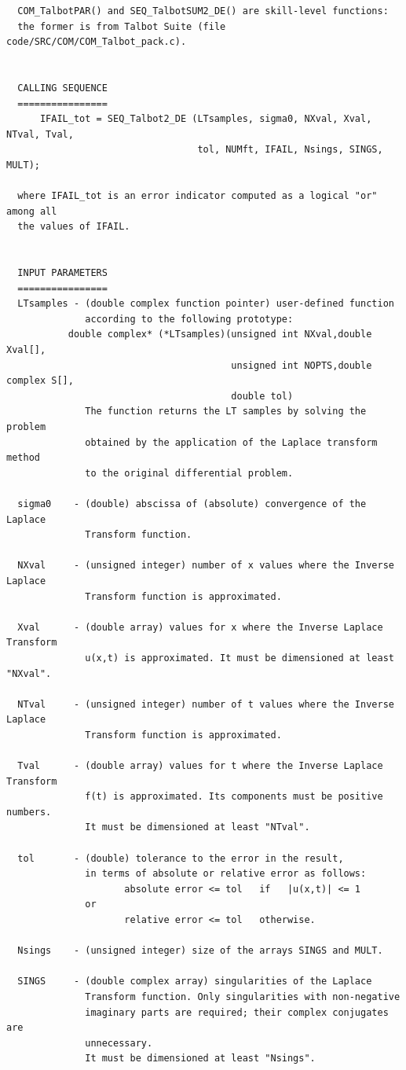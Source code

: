 \documentclass[a4paper,10pt]{report}%
\begin{document}
\begin{lstlisting}
  COM_TalbotPAR() and SEQ_TalbotSUM2_DE() are skill-level functions:
  the former is from Talbot Suite (file code/SRC/COM/COM_Talbot_pack.c).


  CALLING SEQUENCE
  ================
      IFAIL_tot = SEQ_Talbot2_DE (LTsamples, sigma0, NXval, Xval, NTval, Tval,
                                  tol, NUMft, IFAIL, Nsings, SINGS, MULT);

  where IFAIL_tot is an error indicator computed as a logical "or" among all
  the values of IFAIL.


  INPUT PARAMETERS
  ================
  LTsamples - (double complex function pointer) user-defined function
              according to the following prototype:
           double complex* (*LTsamples)(unsigned int NXval,double Xval[],
                                        unsigned int NOPTS,double complex S[],
                                        double tol)
              The function returns the LT samples by solving the problem
              obtained by the application of the Laplace transform method
              to the original differential problem.

  sigma0    - (double) abscissa of (absolute) convergence of the Laplace
              Transform function.

  NXval     - (unsigned integer) number of x values where the Inverse Laplace
              Transform function is approximated.

  Xval      - (double array) values for x where the Inverse Laplace Transform
              u(x,t) is approximated. It must be dimensioned at least "NXval".

  NTval     - (unsigned integer) number of t values where the Inverse Laplace
              Transform function is approximated.

  Tval      - (double array) values for t where the Inverse Laplace Transform
              f(t) is approximated. Its components must be positive numbers.
              It must be dimensioned at least "NTval".

  tol       - (double) tolerance to the error in the result,
              in terms of absolute or relative error as follows:
                     absolute error <= tol   if   |u(x,t)| <= 1
              or
                     relative error <= tol   otherwise.

  Nsings    - (unsigned integer) size of the arrays SINGS and MULT.

  SINGS     - (double complex array) singularities of the Laplace
              Transform function. Only singularities with non-negative
              imaginary parts are required; their complex conjugates are
              unnecessary.
              It must be dimensioned at least "Nsings".


\end{lstlisting}
\end{document}
